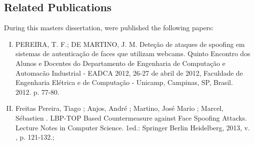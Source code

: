 \begin{appendices}




\chapter{Related Publications}
\label{AppendixA}

During this masters dissertation, were published the following papers:

\begin{enumerate}[I.]
	\item PEREIRA, T. F.; DE MARTINO, J. M. Dete\c{c}\~ao de ataques de spoofing em sistemas de autentica\c{c}\~ao de faces que utilizam webcams. Quinto Encontro dos Alunos e Docentes do Departamento de Engenharia de Computa\c{c}\~ao e Automac\~ao Industrial - EADCA 2012, 26-27 de abril de 2012, Faculdade de Engenharia El\'etrica e de Computa\c{c}\~ao - Unicamp, Campinas, SP, Brasil. 2012. p. 77-80.

	\item Freitas Pereira, Tiago ; Anjos, Andr\'e ; Martino, Jos\'e Mario ; Marcel, S\'ebastien . LBP-TOP Based Countermeasure against Face Spoofing Attacks. Lecture Notes in Computer Science. 1ed.: Springer Berlin Heidelberg, 2013, v. , p. 121-132.;


\end{enumerate}
\end{appendices}
